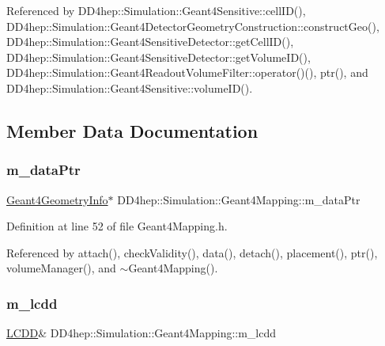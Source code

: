 Referenced by D\+D4hep\+::\+Simulation\+::\+Geant4\+Sensitive\+::cell\+I\+D(), D\+D4hep\+::\+Simulation\+::\+Geant4\+Detector\+Geometry\+Construction\+::construct\+Geo(), D\+D4hep\+::\+Simulation\+::\+Geant4\+Sensitive\+Detector\+::get\+Cell\+I\+D(), D\+D4hep\+::\+Simulation\+::\+Geant4\+Sensitive\+Detector\+::get\+Volume\+I\+D(), D\+D4hep\+::\+Simulation\+::\+Geant4\+Readout\+Volume\+Filter\+::operator()(), ptr(), and D\+D4hep\+::\+Simulation\+::\+Geant4\+Sensitive\+::volume\+I\+D().



\subsection{Member Data Documentation}
\hypertarget{class_d_d4hep_1_1_simulation_1_1_geant4_mapping_a93f0104487f0ff971b9b72777e287c75}{}\label{class_d_d4hep_1_1_simulation_1_1_geant4_mapping_a93f0104487f0ff971b9b72777e287c75} 
\subsubsection{\texorpdfstring{m\+\_\+data\+Ptr}{m\_dataPtr}}
{\footnotesize\ttfamily \hyperlink{class_d_d4hep_1_1_simulation_1_1_geant4_geometry_info}{Geant4\+Geometry\+Info}$\ast$ D\+D4hep\+::\+Simulation\+::\+Geant4\+Mapping\+::m\+\_\+data\+Ptr\hspace{0.3cm}{\ttfamily [protected]}}



Definition at line 52 of file Geant4\+Mapping.\+h.



Referenced by attach(), check\+Validity(), data(), detach(), placement(), ptr(), volume\+Manager(), and $\sim$\+Geant4\+Mapping().

\hypertarget{class_d_d4hep_1_1_simulation_1_1_geant4_mapping_a4c514a5fa835d901c01cf5a860960958}{}\label{class_d_d4hep_1_1_simulation_1_1_geant4_mapping_a4c514a5fa835d901c01cf5a860960958} 
\subsubsection{\texorpdfstring{m\+\_\+lcdd}{m\_lcdd}}
{\footnotesize\ttfamily \hyperlink{class_d_d4hep_1_1_simulation_1_1_geant4_mapping_a7b098323f9ea570a13d220fe3f09da41}{L\+C\+DD}\& D\+D4hep\+::\+Simulation\+::\+Geant4\+Mapping\+::m\+\_\+lcdd\hspace{0.3cm}{\ttfamily [protected]}}



